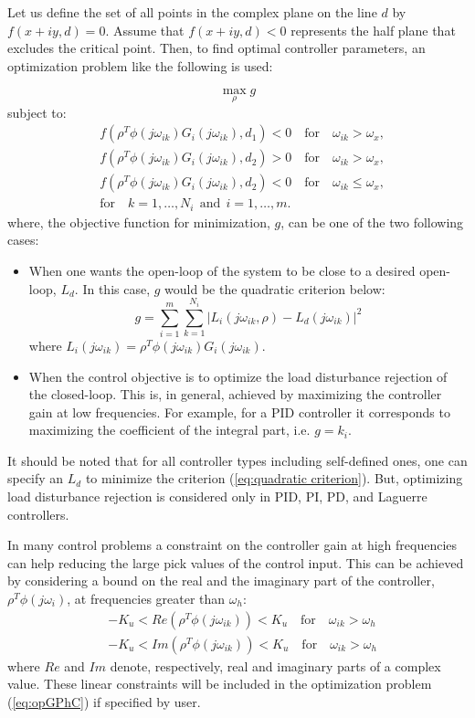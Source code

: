 \documentclass [12pt , a4paper] {report}
\begin{document}
Let us define the set of all points in the complex plane on the line $d$ by $f(x+iy, d) = 0$. Assume that $f(x+iy, d) < 0$ represents the half plane that excludes the critical point. Then, to find optimal controller parameters, an optimization problem like the following is used:

\newpage
 \[
\max_\rho{g}
\]
subject to:
\begin{align}
\label{eq:opGPhC}
& f(\rho^T \phi(j\omega_{ik})G_i(j\omega_{ik}),d_1)<0 \quad \mbox{for} \quad \omega_{ik}>\omega_x, \nonumber \\
& f(\rho^T \phi(j\omega_{ik})G_i(j\omega_{ik}),d_2)>0 \quad \mbox{for} \quad \omega_{ik}>\omega_x,  \\
& f(\rho^T \phi(j\omega_{ik})G_i(j\omega_{ik}),d_2)<0 \quad \mbox{for} \quad \omega_{ik} \leqslant \omega_x, \nonumber \\
& \mbox{for} \quad k=1,\ldots,N_i \:\: \mbox{and} \:\: i=1,\ldots,m. \nonumber
\end{align}
where, the objective function for minimization, $g$, can be one of the two following cases:
\begin{itemize}
\item When one wants the open-loop of the system to be close to a desired open-loop, $L_d$. In this case, $g$ would be the quadratic criterion below:
\begin{equation}
g=\sum_{i=1}^{m}\sum_{k=1}^{N_i} |L_i(j\omega_{ik},\rho)-L_d(j\omega_{ik})|^2
\label{eq:quadratic criterion}
\end{equation}
where $L_i(j\omega_{ik})=\rho^T \phi(j\omega_{ik})G_i(j\omega_{ik})$.

\item When the control objective is to optimize the load disturbance rejection of the closed-loop. This is, in general, achieved by maximizing the controller gain at low frequencies. For example, for a PID controller it corresponds to maximizing the coefficient of the integral part, i.e. $g = k_i$.
\end{itemize}

It should be noted that for all controller types including self-defined ones, one can specify an $L_d$ to minimize the criterion (\ref{eq:quadratic criterion}). But, optimizing load disturbance rejection is considered only in PID, PI, PD, and Laguerre controllers.

In many control problems a constraint on the controller gain at high frequencies can help reducing the large pick values of the control input. This can be achieved by considering a bound on the real and the imaginary part of the controller, $\rho^T\phi(j\omega_{i})$, at frequencies greater than $\omega_h$:
\begin{align}
& -K_u<Re(\rho^T \phi(j\omega_{ik}))<K_u \quad \mbox{for} \quad \omega_{ik} > \omega_h \nonumber \\
& -K_u<Im(\rho^T \phi(j\omega_{ik}))<K_u \quad \mbox{for} \quad \omega_{ik} > \omega_h 
\label{eq:Kuwh}
\end{align} 
where $Re$ and $Im$ denote, respectively, real and imaginary parts of a complex value. These linear constraints will be included in the optimization problem (\ref{eq:opGPhC}) if specified by user.
\end{document}
